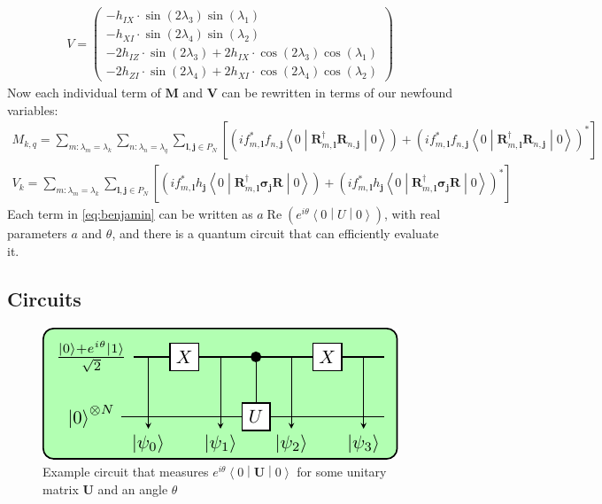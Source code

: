 \documentclass{aux/ttuthes2007}
\newcommand{\sandwich}[3]{\left< #1 \middle\vert #2 \middle\vert #3 \right>}
\newcommand{\s}[1]{\sin\left( #1 \right)}
\newcommand{\co}[1]{\cos\left( #1 \right)}
\newcommand{\paren}[1]{\left( #1 \right)}
\newcommand{\elec}{N}
\begin{document}
\begin{equation*}
	\begin{split}
		V = \begin{pmatrix}
		-	h_{IX} \cdot \s  {2 \lambda_3} \s  {\lambda_1}
%
	\\
		-	h_{XI} \cdot \s  {2 \lambda_4} \s  {\lambda_2}
%
	\\
%
%
		-	2 h_{IZ} \cdot \s  {2 \lambda_3}
		+	2 h_{IX} \cdot \co {2 \lambda_3} \co {\lambda_1}
%
	\\
%
		-	2 h_{ZI} \cdot \s  {2 \lambda_4}
		+	2 h_{XI} \cdot \co {2 \lambda_4} \co {\lambda_2}
		\end{pmatrix}
	\end{split}
\end{equation*}
%
Now each individual term of $\bm M$ and $\bm V$ can be rewritten in terms of our newfound variables:
%
\begin{equation}\label{eq:benjamin}
\begin{split}
	M_{k, q} 
	= \sum_{m:\lambda_m=\lambda_k} \sum_{n:\lambda_n=\lambda_q} \sum_{\bm l, \bm j \in P_\elec}
	\left[
	\paren{if_{m, \bm l}^*f_{n, \bm j}\sandwich 0 {\bm R_{m, \bm l}^\dagger \bm R_{n, \bm j}} 0}
	+\paren{if_{m, \bm l}^*f_{n, \bm j}\sandwich 0 {\bm R_{m, \bm l}^\dagger \bm R_{n, \bm j}} 0}^*
	\right]\\
	V_{k} 
	= \sum_{m:\lambda_m=\lambda_k} \sum_{\bm l, \bm j \in P_\elec}
	\left[
		\paren{if_{m, \bm l}^*h_{\bm j}\sandwich 0 {\bm R_{m, \bm l}^\dagger \bm \sigma_{\bm j} \bm R} 0}
		+\paren{if_{m, \bm l}^*h_{\bm j}\sandwich 0 {\bm R_{m, \bm l}^\dagger \bm \sigma_{\bm j} \bm R} 0}^*
	\right]
\end{split}
\end{equation}
%
Each term in \ref{eq:benjamin} can be written as $a\operatorname{Re}\paren{e^{i\theta}\sandwich 0 U 0}$, with real parameters $a$ and $\theta$, and there is a quantum circuit that can efficiently evaluate it.
%
\subsection{\textbf{Circuits}}

\begin{figure}[hb!]
  \includegraphics[width=\linewidth]{circuits/circuit1.pdf}
  \caption[Example reduced circuit]{Example circuit that measures $e^{i\theta}\sandwich{0}{\bm U}{0}$ for some unitary matrix $\bm U$ and an angle $\theta$}
  \label{fig:circuitreal}
\end{figure}
\end{document}
